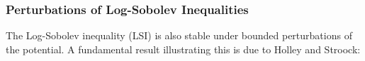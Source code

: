 \documentclass[11pt, twoside]{report}
\begin{document}

\subsubsection{Perturbations of Log-Sobolev Inequalities}

The Log-Sobolev inequality (LSI) is also stable under bounded perturbations of the potential. A fundamental result illustrating this is due to Holley and Stroock:
\end{document}
